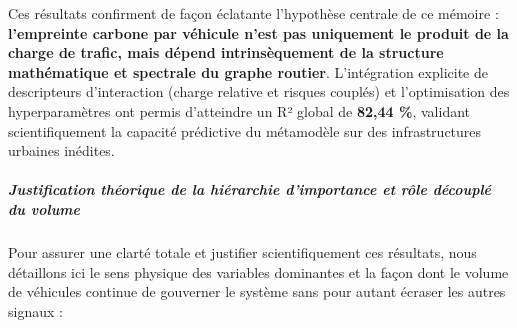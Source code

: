 \documentclass[10pt, a4paper]{article}
\begin{document}
Ces résultats confirment de façon éclatante l'hypothèse centrale de ce
mémoire : \textbf{l'empreinte carbone par véhicule n'est pas uniquement
le produit de la charge de trafic, mais dépend intrinsèquement de la
structure mathématique et spectrale du graphe routier}. L'intégration
explicite de descripteurs d'interaction (charge relative et risques
couplés) et l'optimisation des hyperparamètres ont permis d'atteindre un
R² global de \textbf{82,44 \%}, validant scientifiquement la capacité
prédictive du métamodèle sur des infrastructures urbaines inédites.

\subparagraph{Justification théorique de la hiérarchie d'importance et
rôle découplé du
volume}\label{justification-thuxe9orique-de-la-hiuxe9rarchie-dimportance-et-ruxf4le-duxe9coupluxe9-du-volume}

Pour assurer une clarté totale et justifier scientifiquement ces
résultats, nous détaillons ici le sens physique des variables dominantes
et la façon dont le volume de véhicules continue de gouverner le système
sans pour autant écraser les autres signaux :
\end{document}
